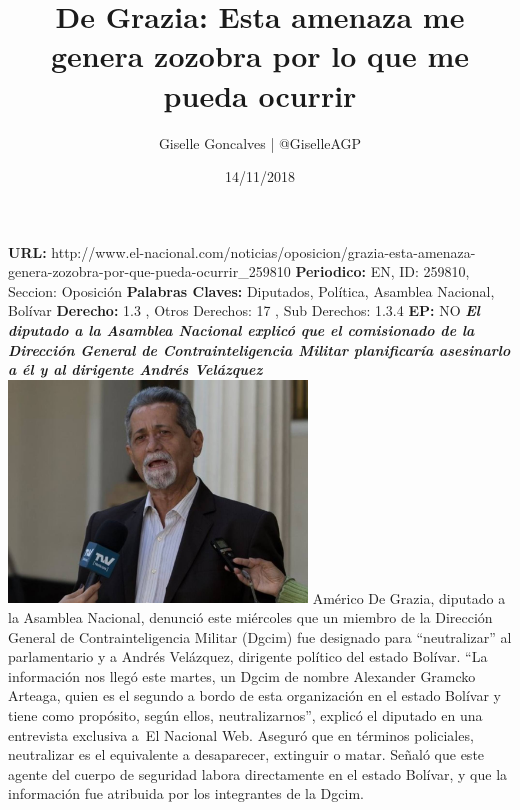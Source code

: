 \documentclass{article}%
\title{\textbf{De Grazia: Esta amenaza me genera zozobra por lo que me pueda ocurrir}}%
\author{Giselle Goncalves | @GiselleAGP}%
\date{14/11/2018}%
\begin{document}
%
\normalsize%
\maketitle%
\textbf{URL: }%
http://www.el{-}nacional.com/noticias/oposicion/grazia{-}esta{-}amenaza{-}genera{-}zozobra{-}por{-}que{-}pueda{-}ocurrir\_259810\newline%
%
\textbf{Periodico: }%
EN, %
ID: %
259810, %
Seccion: %
Oposición\newline%
%
\textbf{Palabras Claves: }%
Diputados, Política, Asamblea Nacional, Bolívar\newline%
%
\textbf{Derecho: }%
1.3%
, Otros Derechos: %
17%
, Sub Derechos: %
1.3.4%
\newline%
%
\textbf{EP: }%
NO\newline%
\newline%
%
\textbf{\textit{El diputado a la Asamblea Nacional explicó que el comisionado de la Dirección General de Contrainteligencia Militar planificaría asesinarlo a él y al dirigente Andrés Velázquez}}%
\newline%
\newline%
%
\includegraphics[width=300px]{168.jpg}%
\newline%
%
Américo De Grazia, diputado a la Asamblea Nacional, denunció este miércoles que un miembro de la Dirección General de Contrainteligencia Militar (Dgcim) fue designado para “neutralizar” al parlamentario y a Andrés Velázquez, dirigente político del estado Bolívar.%
\newline%
%
“La información nos llegó este martes, un Dgcim de nombre Alexander Gramcko Arteaga, quien es el segundo a bordo de esta organización en el estado Bolívar y tiene como propósito, según ellos, neutralizarnos”, explicó el diputado en una entrevista exclusiva a~El Nacional Web.%
\newline%
%
Aseguró que en términos policiales, neutralizar es el equivalente a desaparecer, extinguir o matar. Señaló que este agente del cuerpo de seguridad labora directamente en el estado Bolívar, y que la información fue atribuida por los integrantes de la Dgcim.%
\end{document}
